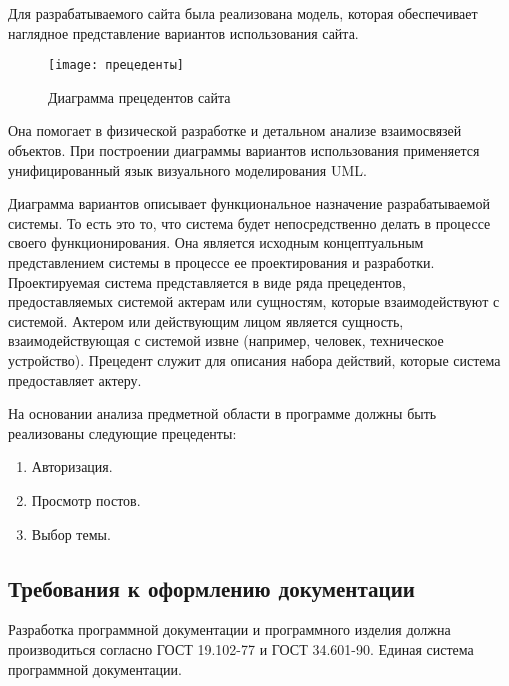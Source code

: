 Для разрабатываемого сайта была реализована модель, которая обеспечивает наглядное представление вариантов использования сайта.

\begin{figure}[ht]
	\texttt{[image: прецеденты]}
	\caption{Диаграмма прецедентов сайта}
	\label{maket:data}
\end{figure}

Она помогает в физической разработке и детальном анализе взаимосвязей объектов. При построении диаграммы вариантов использования применяется унифицированный язык визуального моделирования UML.

Диаграмма вариантов описывает функциональное назначение разрабатываемой системы. То есть это то, что система будет непосредственно делать в процессе своего функционирования. Она является исходным концептуальным представлением системы в процессе ее проектирования и разработки. Проектируемая система представляется в виде ряда прецедентов, предоставляемых системой актерам или сущностям, которые взаимодействуют с системой. Актером или действующим лицом является сущность, взаимодействующая с системой извне (например, человек, техническое устройство). Прецедент служит для описания набора действий, которые система предоставляет актеру.

На основании анализа предметной области в программе должны быть реализованы следующие прецеденты:
\begin{enumerate}
\item Авторизация.
\item Просмотр постов.
\item Выбор темы.
\end{enumerate}

\subsection{Требования к оформлению документации}

Разработка программной документации и программного изделия должна производиться согласно ГОСТ 19.102-77 и ГОСТ 34.601-90. Единая система программной документации.
